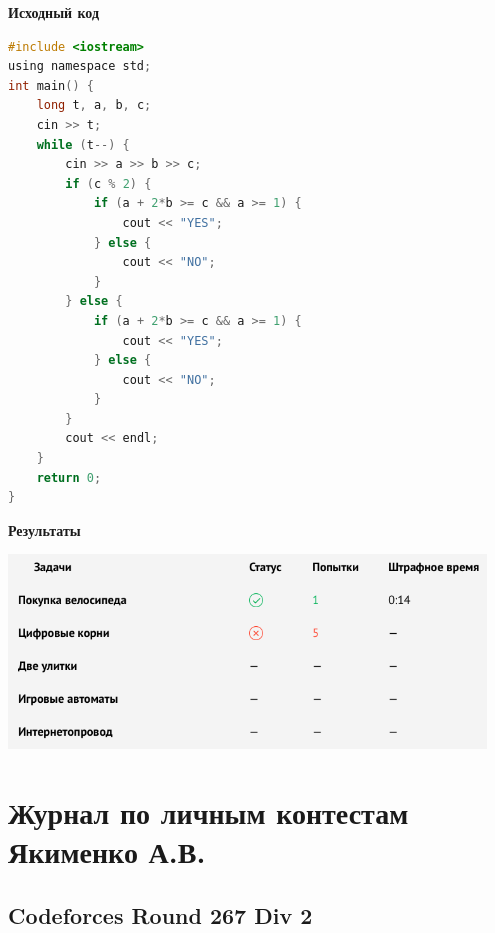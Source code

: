 \documentclass[a4paper,12pt]{article}
\begin{document}
\textbf{{\large Исходный код}}
\begin{lstlisting}[language=C]
#include <iostream>
using namespace std;
int main() {
	long t, a, b, c;
	cin >> t;
	while (t--) {
		cin >> a >> b >> c;
		if (c % 2) {
			if (a + 2*b >= c && a >= 1) {
				cout << "YES";
			} else {
				cout << "NO";
			}
		} else {
			if (a + 2*b >= c && a >= 1) {
				cout << "YES";
			} else {
				cout << "NO";
			}
		}
		cout << endl;
	}
	return 0;
}
\end{lstlisting}

\textbf{{\large Результаты}} \\
\begin{center}
\includegraphics[width=0.95\textwidth]{RCC/RCC_result.png}\\ [1cm]
\end{center}






\newpage
\section{Журнал по личным контестам Якименко А.В.}

%
%

\newpage
\subsection{Codeforces Round 267 Div 2}
\end{document}

